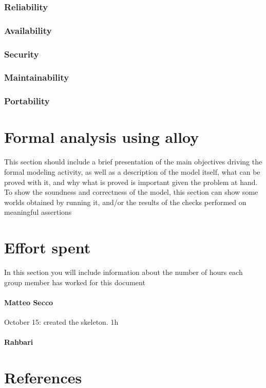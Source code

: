 \documentclass{article}
\begin{document}
		\subsubsection{Reliability}
		\subsubsection{Availability}
		\subsubsection{Security}
		\subsubsection{Maintainability}
		\subsubsection{Portability}
\section{Formal analysis using alloy} This section should include a brief presentation of the main objectives driving the formal modeling activity, as well as a description of the model itself, what can be proved with it, and why what is proved is important given the problem at hand. To show the soundness and correctness of the model, this section can show some worlds obtained by running it, and/or the results of the checks performed on meaningful assertions
\section{Effort spent} In this section you will include information about the number of hours each group member has worked for this document
	\paragraph{Matteo Secco} 
		\begin{list}{-}{}
			\item October 15: created the skeleton. 1h
		\end{list}
	\paragraph{Rahbari}
\section{References}
\end{document}
